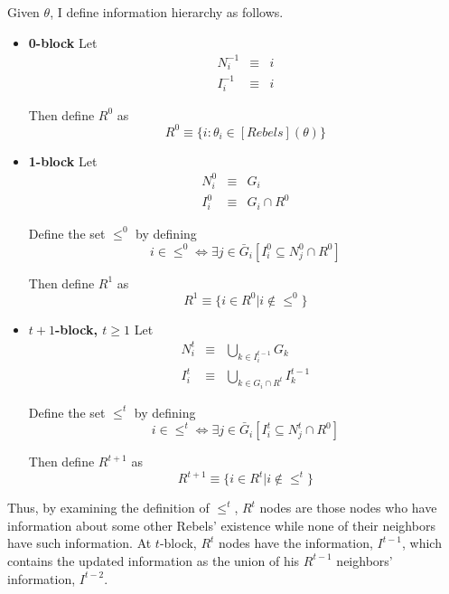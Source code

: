 \documentclass[12pt,letterpaper]{article}
\newtheorem*{main result}{Main Result}
\theoremstyle{definition}
\theoremstyle{remark}
\theoremstyle{claim}
\begin{document}
Given $\theta$, I define information hierarchy as follows.
\begin{itemize}

\item \textbf{0-block}
Let
\begin{eqnarray*}
N^{-1}_i &\equiv &  i \\
I^{-1}_i & \equiv & i
\end{eqnarray*}

Then define $R^0$ as 
\begin{equation}
R^0\equiv\{i:\theta_i\in[Rebels](\theta)\}
\end{equation}

\item \textbf{1-block}
Let
\begin{eqnarray*}
N^0_i &\equiv &  G_i \\
I^0_i & \equiv & G_i\cap R^0
\end{eqnarray*}

Define the set $\leq^0$ by defining
\begin{equation}i\in \leq^0 \Leftrightarrow \exists  j\in \bar{G}_i [I^0_i\subseteq N^0_j\cap R^0]\end{equation}  

Then define $R^1$ as 
\begin{equation}
R^{1} \equiv \{i\in R^0|i\notin \leq^0\}
\end{equation}

\item \textbf{$t+1$-block, $t\geq 1$}
Let
\begin{eqnarray*}
N^t_i & \equiv & \bigcup_{k\in I^{t-1}_i}G_k \\
I^t_i & \equiv & \bigcup_{k\in G_i\cap R^t}I^{t-1}_k
\end{eqnarray*}


Define the set $\leq^t$ by defining
\begin{equation}i\in \leq^t \Leftrightarrow \exists j\in \bar{G}_i[I^t_i\subseteq N^t_j\cap R^0]\end{equation}

Then define $R^{t+1}$ as 
\begin{equation}
R^{t+1} \equiv  \{i\in R^t|i\notin \leq^t\}
\end{equation}


\end{itemize}

Thus, by examining the definition of $\leq^t$, $R^t$ nodes are those nodes who have information about some other Rebels' existence while none of their neighbors have such information. At $t$-block, $R^t$ nodes have the information, $I^{t-1}$, which contains the updated information as the union of his $R^{t-1}$ neighbors' information, $I^{t-2}$. 
\end{document}
